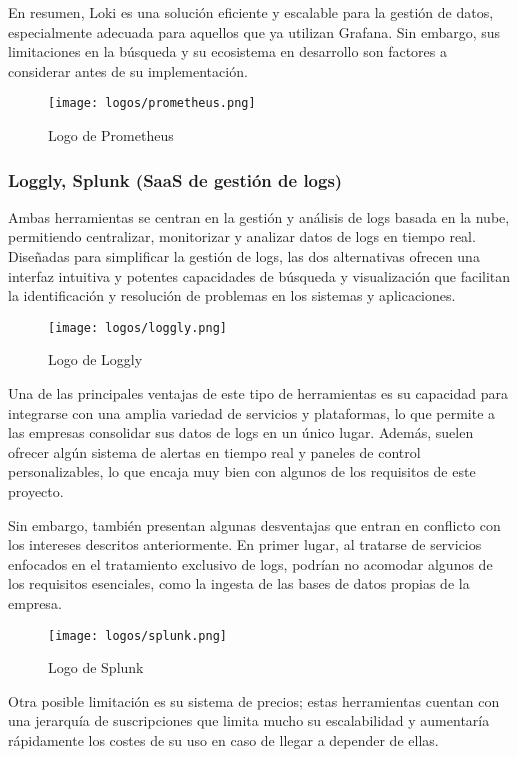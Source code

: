 En resumen, Loki es una solución eficiente y escalable para la gestión de datos,
especialmente adecuada para aquellos que ya utilizan Grafana. Sin embargo, sus
limitaciones en la búsqueda y su ecosistema en desarrollo son factores a
considerar antes de su implementación.

\begin{figure}[H]
	\centering
	\texttt{[image: logos/prometheus.png]}
	\caption{Logo de Prometheus~\textregistered}
\end{figure}


\newpage
\subsubsection{Loggly, Splunk (SaaS de gestión de logs)}
Ambas herramientas se centran en la gestión y análisis de logs basada en la nube,
permitiendo centralizar, monitorizar y analizar datos de logs en tiempo real.
Diseñadas para simplificar la gestión de logs, las dos alternativas ofrecen una
interfaz intuitiva y potentes capacidades de búsqueda y visualización que
facilitan la identificación y resolución de problemas en los sistemas y
aplicaciones.

\begin{figure}[H]
	\centering
	\texttt{[image: logos/loggly.png]}
	\caption{Logo de Loggly~\textregistered}
\end{figure}

Una de las principales ventajas de este tipo de herramientas es su capacidad
para integrarse con una amplia variedad de servicios y plataformas, lo que
permite a las empresas consolidar sus datos de logs en un único lugar. Además,
suelen ofrecer algún sistema de alertas en tiempo real y paneles de control
personalizables, lo que encaja muy bien con algunos de los requisitos de este
proyecto.

Sin embargo, también presentan algunas desventajas que entran en conflicto con
los intereses descritos anteriormente. En primer lugar, al tratarse de
servicios enfocados en el tratamiento exclusivo de logs, podrían no acomodar
algunos de los requisitos esenciales, como la ingesta de las bases de datos
propias de la empresa.

\begin{figure}[H]
	\centering
	\texttt{[image: logos/splunk.png]}
	\caption{Logo de Splunk~\textregistered}
\end{figure}

Otra posible limitación es su sistema de precios; estas herramientas cuentan con
una jerarquía de suscripciones que limita mucho su escalabilidad y aumentaría
rápidamente los costes de su uso en caso de llegar a depender de ellas.

